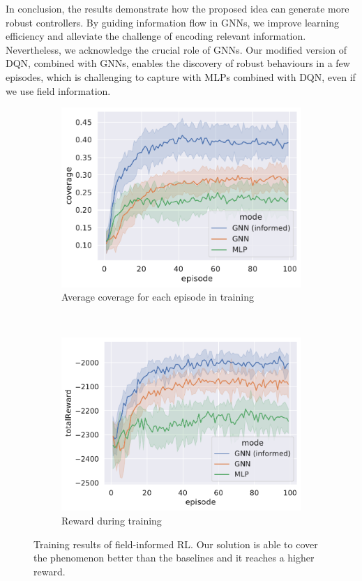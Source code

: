 \documentclass[conference]{IEEEtran}
\begin{document}
In conclusion, the results demonstrate how the proposed idea can generate more robust controllers. 
 By guiding information flow in \acp{GNN}, 
 we improve learning efficiency and alleviate the challenge of encoding relevant information. 
%
Nevertheless, we acknowledge the crucial role of \acp{GNN}. 
 Our modified version of DQN, combined with \acp{GNN}, 
 enables the discovery of robust behaviours in a few episodes, 
 which is challenging to capture with \acp{MLP} combined with \ac{DQN}, even if we use field information.
\begin{figure}
  \centering
  \hfill
  \begin{subfigure}[b]{0.96\linewidth}
    \includegraphics[width=\linewidth]{imgs/coverage-in-time}
    \caption{Average coverage for each episode in training }
    \label{fig:coverage}
  \end{subfigure}\\
  \hfill
  \begin{subfigure}[b]{0.99\linewidth}
    \includegraphics[width=\linewidth]{imgs/reward-in-time}
    \caption{Reward during training}
    \label{fig:reward}
  \end{subfigure}
  \caption{Training results of field-informed \ac{RL}. 
  Our solution is able to cover the phenomenon better than the baselines and it reaches a higher reward. 
  }
  \label{fig:training}
\end{figure}
\end{document}
